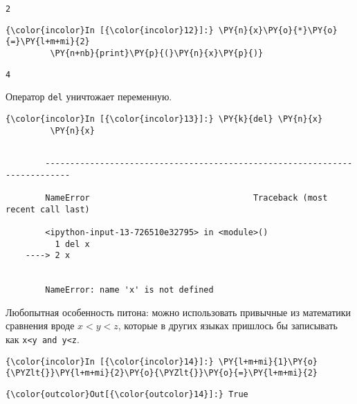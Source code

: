     \begin{Verbatim}[commandchars=\\\{\}]
2

    \end{Verbatim}

    \begin{Verbatim}[commandchars=\\\{\}]
{\color{incolor}In [{\color{incolor}12}]:} \PY{n}{x}\PY{o}{*}\PY{o}{=}\PY{l+m+mi}{2}
         \PY{n+nb}{print}\PY{p}{(}\PY{n}{x}\PY{p}{)}
\end{Verbatim}

    \begin{Verbatim}[commandchars=\\\{\}]
4

    \end{Verbatim}

    Оператор \texttt{del} уничтожает переменную.

    \begin{Verbatim}[commandchars=\\\{\}]
{\color{incolor}In [{\color{incolor}13}]:} \PY{k}{del} \PY{n}{x}
         \PY{n}{x}
\end{Verbatim}

    \begin{Verbatim}[commandchars=\\\{\}]

        ---------------------------------------------------------------------------

        NameError                                 Traceback (most recent call last)

        <ipython-input-13-726510e32795> in <module>()
          1 del x
    ----> 2 x
    

        NameError: name 'x' is not defined

    \end{Verbatim}

    Любопытная особенность питона: можно использовать привычные из
математики сравнения вроде \(x<y<z\), которые в других языках пришлось
бы записывать как \texttt{x\textless{}y\ and\ y\textless{}z}.

    \begin{Verbatim}[commandchars=\\\{\}]
{\color{incolor}In [{\color{incolor}14}]:} \PY{l+m+mi}{1}\PY{o}{\PYZlt{}}\PY{l+m+mi}{2}\PY{o}{\PYZlt{}}\PY{o}{=}\PY{l+m+mi}{2}
\end{Verbatim}

            \begin{Verbatim}[commandchars=\\\{\}]
{\color{outcolor}Out[{\color{outcolor}14}]:} True
\end{Verbatim}
        
